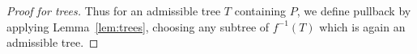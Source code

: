 \documentclass{amsart}
\theoremstyle{definition}
\theoremstyle{remark}
\begin{document}
\begin{proof}[Proof for trees]
Thus for an admissible tree $T$ containing $P$, we define pullback by applying Lemma~\ref{lem:trees}, choosing any subtree of $f^{-1}(T)$ which is again an admissible tree.
\end{proof}


%

\end{document}
